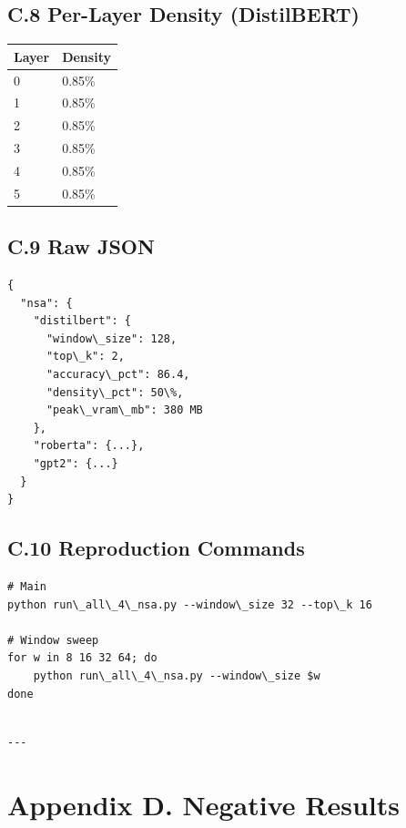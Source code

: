 \subsection{C.8 Per-Layer Density (DistilBERT)}

\begin{table}[H]
\centering
\small
\begin{tabular}{ll}
\toprule
\textbf{Layer} & \textbf{Density} \\
\midrule
0 & 0.85\% \\
1 & 0.85\% \\
2 & 0.85\% \\
3 & 0.85\% \\
4 & 0.85\% \\
5 & 0.85\% \\
\bottomrule
\end{tabular}
\end{table}

\subsection{C.9 Raw JSON}

\begin{lstlisting}
{
  "nsa": {
    "distilbert": {
      "window\_size": 128,
      "top\_k": 2,
      "accuracy\_pct": 86.4,
      "density\_pct": 50\%,
      "peak\_vram\_mb": 380 MB
    },
    "roberta": {...},
    "gpt2": {...}
  }
}
\end{lstlisting}

\subsection{C.10 Reproduction Commands}

\begin{lstlisting}
# Main
python run\_all\_4\_nsa.py --window\_size 32 --top\_k 16

# Window sweep
for w in 8 16 32 64; do
    python run\_all\_4\_nsa.py --window\_size $w
done
\end{lstlisting}
\begin{lstlisting}

---
\end{lstlisting}


\section{Appendix D. Negative Results}

